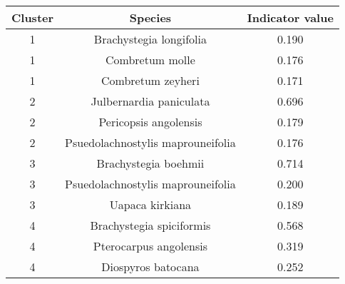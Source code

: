 \begin{table}[ht]
\centering
\begin{tabular}{ccc}
  \hline
Cluster & Species & Indicator value \\ 
  \hline
1 & Brachystegia longifolia & 0.190 \\ 
  1 & Combretum molle & 0.176 \\ 
  1 & Combretum zeyheri & 0.171 \\ 
  2 & Julbernardia paniculata & 0.696 \\ 
  2 & Pericopsis angolensis & 0.179 \\ 
  2 & Psuedolachnostylis maprouneifolia & 0.176 \\ 
  3 & Brachystegia boehmii & 0.714 \\ 
  3 & Psuedolachnostylis maprouneifolia & 0.200 \\ 
  3 & Uapaca kirkiana & 0.189 \\ 
  4 & Brachystegia spiciformis & 0.568 \\ 
  4 & Pterocarpus angolensis & 0.319 \\ 
  4 & Diospyros batocana & 0.252 \\ 
   \hline
\end{tabular}
\label{indval}
\end{table}

